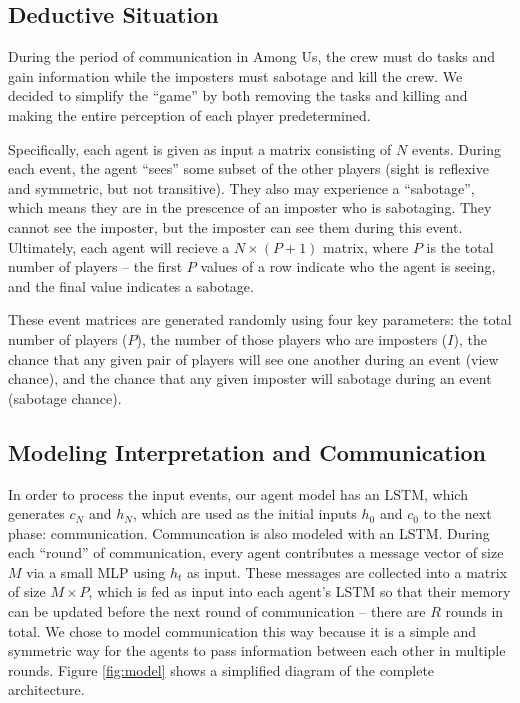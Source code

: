 \documentclass[10pt,twocolumn,letterpaper]{article}
\begin{document}
\subsection{Deductive Situation}
During the period of communication in Among Us, the crew must do tasks
and gain information while the imposters must sabotage and kill the crew. We decided
to simplify the ``game'' by both removing the tasks and killing and making the entire
perception of each player predetermined. 

Specifically, each agent is given as input a matrix consisting
of $N$ events. During each event, the agent ``sees'' some subset of the other players
(sight is reflexive and symmetric, but not transitive).
They also may experience a ``sabotage'', which means they are in the prescence
of an imposter who is sabotaging. They cannot see the imposter, but the imposter
can see them during this event. Ultimately, each agent will recieve
a $N \times (P + 1)$ matrix, where $P$ is the total number of players -- the first
$P$ values of a row indicate who the agent is seeing, and the final value indicates
a sabotage.

These event matrices are generated randomly using four key parameters: the total number
of players ($P$), the number of those players who are imposters ($I$), the chance that
any given pair of players will see one another during an event (view chance), and the 
chance that any given imposter will sabotage during an  event (sabotage chance).

\subsection{Modeling Interpretation and Communication}
In order to process the input events, our agent model has an LSTM, which
generates $c_N$ and $h_N$, which are used as the initial inputs
$h_0$ and $c_0$ to the next phase:
communication. Communcation is also modeled with an LSTM. During each ``round''
of communication, every agent contributes a message vector of size $M$ via
a small MLP using $h_t$ as input. These messages are collected into a matrix
of size $M \times P$, which is fed as input into each agent's LSTM so that
their memory can be updated before the next round of communication -- there
are $R$ rounds in total. We chose
to model communication this way because it is a simple and symmetric way for the agents
to pass information between each other in multiple rounds.
Figure \ref{fig:model} shows a simplified diagram of the complete
architecture.
   
\end{document}
